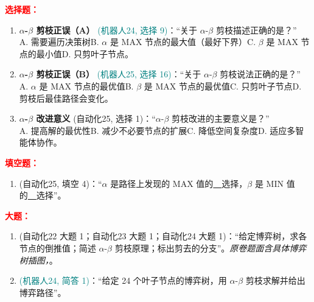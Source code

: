 ﻿\documentclass[../main.tex]{subfiles}
\begin{document}
\noindent\textbf{\textcolor{red}{选择题：}}
\begin{enumerate}[itemsep=0.45em, topsep=0.2em, leftmargin=1.5em]
    \item \textbf{$\alpha$-$\beta$ 剪枝正误（A）} \textcolor{teal}{(机器人24, 选择 9)}：``关于 $\alpha$-$\beta$ 剪枝描述正确的是？''\\
    A. 需要遍历决策树\quad B. $\alpha$ 是 MAX 节点的最大值（最好下界）\quad C. $\beta$ 是 MAX 节点的最小值\quad D. 只剪叶子节点。 

    \item \textbf{$\alpha$-$\beta$ 剪枝正误（B）} \textcolor{teal}{(机器人25, 选择 16)}：``关于 $\alpha$-$\beta$ 剪枝说法正确的是？''\\
    A. $\alpha$ 是 MAX 节点的最优值\quad B. $\beta$ 是 MAX 节点的最优值\quad C. 只剪叶子节点\quad D. 剪枝后最佳路径会变化。 

    \item \textbf{$\alpha$-$\beta$ 改进意义} \textcolor{autoclassgreen}{(自动化25, 选择 1)}：``$\alpha$-$\beta$ 剪枝改进的主要意义是？''\\
    A. 提高解的最优性\quad B. 减少不必要节点的扩展\quad C. 降低空间复杂度\quad D. 适应多智能体协作。 
\end{enumerate}

\noindent\textbf{\textcolor{red}{填空题：}}
\begin{enumerate}[itemsep=0.3em, topsep=0.2em, leftmargin=1.5em]
    \item \textcolor{autoclassgreen}{(自动化25, 填空 4)}：``$\alpha$ 是路径上发现的 MAX 值的\underline{\ \ }选择，$\beta$ 是 MIN 值的\underline{\ \ }选择''。 
\end{enumerate}

\noindent\textbf{\textcolor{red}{大题：}}
\begin{enumerate}[itemsep=0.3em, topsep=0.2em, leftmargin=1.5em]
    \item \textcolor{autoclassgreen}{(自动化22 大题 1；自动化23 大题 1；自动化24 大题 1)}：``给定博弈树，求各节点的倒推值；简述 $\alpha$-$\beta$ 剪枝原理；标出剪去的分支''。\textit{原卷题面含具体博弈树插图，}。 
    \item \textcolor{teal}{(机器人24, 简答 1)}：``给定 24 个叶子节点的博弈树，用 $\alpha$-$\beta$ 剪枝求解并给出博弈路径''。 
\end{enumerate}
\end{document}
